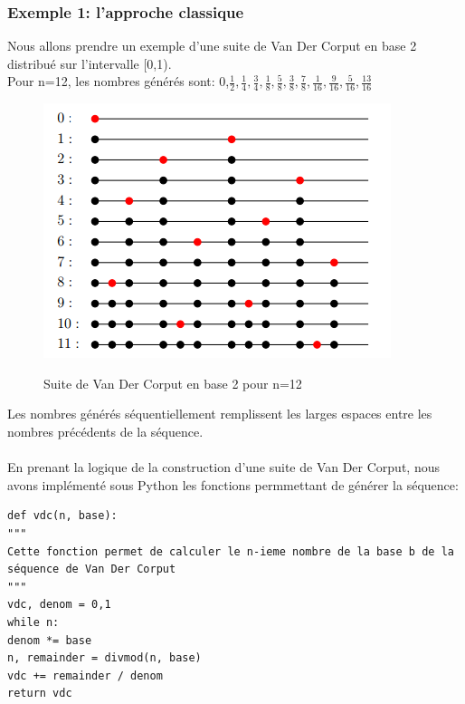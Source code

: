 \documentclass[12pt]{report}
\begin{document}
\subsubsection{Exemple 1: l'approche classique}
Nous allons prendre un exemple d'une suite de Van Der Corput en base 2 distribué sur l'intervalle [0,1).\\
Pour n=12, les nombres générés sont: 0,$\frac{1}{2},\frac{1}{4},\frac{3}{4},\frac{1}{8},\frac{5}{8},\frac{3}{8},\frac{7}{8},\frac{1}{16},\frac{9}{16},\frac{5}{16},\frac{13}{16}$\\
\bigbreak
\begin{figure}[h]
	\begin{center}
	\includegraphics[scale=0.5]{figure1-van-der-corput.png}\\
	\end{center}
\caption{Suite de Van Der Corput en base 2 pour n=12}
\end{figure}
Les nombres générés séquentiellement remplissent les larges espaces entre les nombres précédents de la séquence.\\
\\En prenant la logique de la construction d'une suite de Van Der Corput, nous avons implémenté sous Python les fonctions permmettant de générer la séquence:\\
\begin{lstlisting}
def vdc(n, base):
"""
Cette fonction permet de calculer le n-ieme nombre de la base b de la 
séquence de Van Der Corput
"""
vdc, denom = 0,1
while n:
denom *= base
n, remainder = divmod(n, base)
vdc += remainder / denom
return vdc
\end{lstlisting}
\bigbreak
\end{document}

